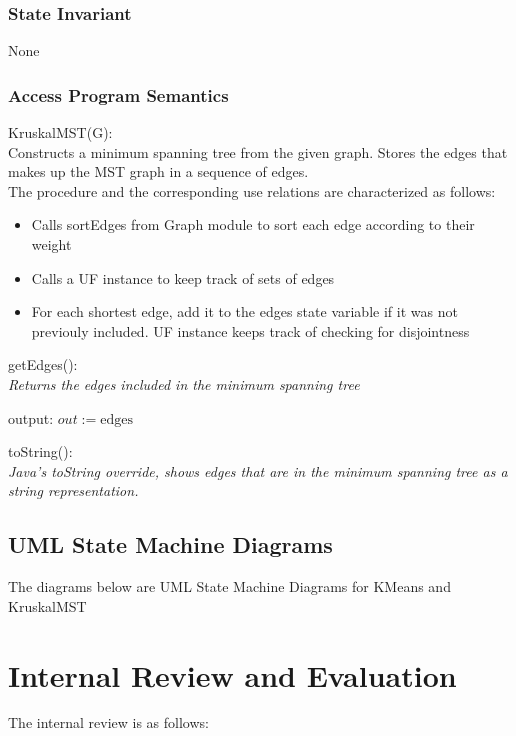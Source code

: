 \documentclass[12pt]{article}
\begin{document}
\subsubsection* {State Invariant}

None

\subsubsection* {Access Program Semantics}

KruskalMST(G):\\
Constructs a minimum spanning tree from the given graph. Stores the edges
that makes up the MST graph in a sequence of edges.\\
\noindent
The procedure and the corresponding use relations are characterized as follows:
\begin{itemize}
\item Calls sortEdges from Graph module to sort each edge according to their weight
\item Calls a UF instance to keep track of sets of edges
\item For each shortest edge, add it to the edges state variable if it was not
previouly included. UF instance keeps track of checking for disjointness
\end{itemize}

\noindent
getEdges():\\
\textit{Returns the edges included in the minimum spanning tree}
\begin{itemize}
output: $out := \mbox{edges}$
\end{itemize}

\noindent
toString():\\
\textit{Java's toString override, shows edges that are in the minimum spanning tree
as a string representation.}

















\newpage

\subsection{UML State Machine Diagrams}
The diagrams below are UML State Machine Diagrams for KMeans and KruskalMST

\newpage
\section{Internal Review and Evaluation}
The internal review is as follows:
\end{document}
